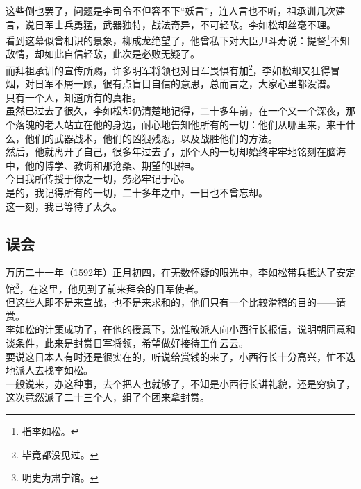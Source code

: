\begin{multicols}{\theparacolNo}
这些倒也罢了，问题是李司令不但容不下“妖言”，连人言也不听，祖承训几次建言，说日军士兵勇猛，武器独特，战法奇异，不可轻敌。李如松却丝毫不理。\\

看到这幕似曾相识的景象，柳成龙绝望了，他曾私下对大臣尹斗寿说：提督\footnote{指李如松。}不知敌情，却如此自信轻敌，此次是必败无疑了。\\

而拜祖承训的宣传所赐，许多明军将领也对日军畏惧有加\footnote{毕竟都没见过。}，李如松却又狂得冒烟，对日军不屑一顾，很有点盲目自信的意思，总而言之，大家心里都没谱。\\

只有一个人，知道所有的真相。\\

虽然已过去了很久，李如松却仍清楚地记得，二十多年前，在一个又一个深夜，那个落魄的老人站立在他的身边，耐心地告知他所有的一切：他们从哪里来，来干什么，他们的武器战术，他们的凶狠残忍，以及战胜他们的方法。\\

然后，他就离开了自己，很多年过去了，那个人的一切却始终牢牢地铭刻在脑海中，他的博学、教诲和那沧桑、期望的眼神。\\

今日我所传授于你之一切，务必牢记于心。\\

是的，我记得所有的一切，二十多年之中，一日也不曾忘却。\\

这一刻，我已等待了太久。\\

\subsection{误会}
万历二十一年（1592年）正月初四，在无数怀疑的眼光中，李如松带兵抵达了安定馆\footnote{明史为肃宁馆。}，在这里，他见到了前来拜会的日军使者。\\

但这些人即不是来宣战，也不是来求和的，他们只有一个比较滑稽的目的——请赏。\\

李如松的计策成功了，在他的授意下，沈惟敬派人向小西行长报信，说明朝同意和谈条件，此来是封赏日军将领，希望做好接待工作云云。\\

要说这日本人有时还是很实在的，听说给赏钱的来了，小西行长十分高兴，忙不迭地派人去找李如松。\\

一般说来，办这种事，去个把人也就够了，不知是小西行长讲礼貌，还是穷疯了，这次竟然派了二十三个人，组了个团来拿封赏。\\


\end{multicols}

